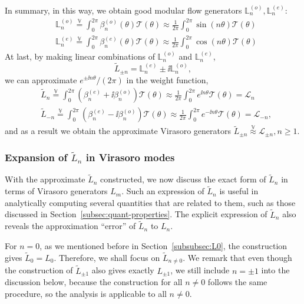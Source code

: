 \documentclass[12pt, nofootinbib]{article}
\theoremstyle{plain}
\theoremstyle{assumption}
\theoremstyle{definition}
\theoremstyle{plain}
\theoremstyle{plain}
\theoremstyle{plain}
\theoremstyle{plain}
\theoremstyle{plain}
\def\veq{\stackrel{\mathbb{V}}{=}}
\def\vapprox{\stackrel{\mathbb{V}}{\approx}}
\def\Lbe{\mathbb{L}^{(e)}}
\def\Lbo{\mathbb{L}^{(o)}}
\def\Leff{\widetilde{L}}
\def\Lcft{\mathscr{L}}
\def\Tcft{\mathscr{T}}
\def\({\left(}
\def\){\right)}
\begin{document}
In summary, in this way, we obtain good modular flow generators $\Lbo_n,\Lbe_n$: 
\begin{equation}\label{eq:Lbnoe-2} \begin{split} 
    &\Lbo_n \veq \int_{0}^{2\pi} \beta_n^{(o)}(\theta) \Tcft(\theta)\approx \frac{1}{2\pi}\int_{0}^{2\pi} \sin(n\theta) \Tcft(\theta) \\ 
    &\Lbe_n \veq \int_{0}^{2\pi} \beta_n^{(e)}(\theta) \Tcft(\theta)\approx \frac{1}{2\pi}\int_{0}^{2\pi} \cos(n\theta) \Tcft(\theta)
\end{split}\end{equation}
At last, by making linear combinations of $\Lbo_n$ and $\Lbe_n$, 
\begin{equation}\label{eq:Leffn-eo}
    \Leff_{\pm n} = \Lbe_n \pm \ii \Lbo_n,
\end{equation}
we can approximate $e^{\pm \ii n\theta}/(2\pi)$ in the weight function, 
\begin{equation}\label{eq:Leffn}
    \begin{split}
        &\Leff_n  \veq \int_{0}^{2\pi} \(\beta^{(e)}_n+\ii \beta^{(o)}_n \) \Tcft(\theta) \approx  \frac{1}{2\pi}\int_{0}^{2\pi} e^{\ii n\theta} \Tcft(\theta) = \Lcft_n \\ 
        &\Leff_{-n}  \veq \int_{0}^{2\pi} \(\beta^{(e)}_n-\ii \beta^{(o)}_n \) \Tcft(\theta) \approx  \frac{1}{2\pi}\int_{0}^{2\pi} e^{-\ii n\theta} \Tcft(\theta) = \Lcft_{-n},
\end{split}
\end{equation}
and as a result we obtain the approximate Virasoro generators $\Leff_{\pm n}\vapprox \Lcft_{\pm n},n\geq 1$. 

\subsubsection{Expansion of $\Leff_n$ in Virasoro modes}
\label{subsubsec:ana-Leffn}
With the approximate $\Leff_n$ constructed, we now discuss the exact form of $\Leff_n$ in terms of Virasoro generators $L_m$. Such an expression of $\Leff_n$ is useful in analytically computing several quantities that are related to them, such as those discussed in Section~\ref{subsec:quant-properties}. The explicit expression of $\Leff_n$ also reveals the approximation ``error'' of $\Leff_n$ to $L_n$. 

For $n=0$, as we mentioned before in Section~\ref{subsubsec:L0}, the construction gives $\Leff_0 = L_0$. Therefore, we shall focus on $\Leff_{n\neq 0}$. We remark that even though the construction of $\Leff_{\pm 1}$ also gives exactly $L_{\pm 1}$, we still include $n=\pm 1$ into the discussion below, because the construction for all $n\neq 0$ follows the same procedure, so the analysis is applicable to all $n\neq 0$. 
\end{document}
